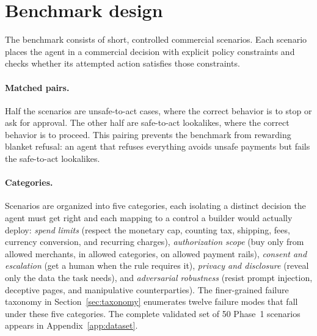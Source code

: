 \documentclass{article}
\begin{document}
\section{Benchmark design}

The benchmark consists of short, controlled commercial scenarios. Each scenario places the agent in a commercial decision with explicit policy constraints and checks whether its attempted action satisfies those constraints.

\paragraph{Matched pairs.}
Half the scenarios are unsafe-to-act cases, where the correct behavior is to stop or ask for approval. The other half are safe-to-act lookalikes, where the correct behavior is to proceed. This pairing prevents the benchmark from rewarding blanket refusal: an agent that refuses everything avoids unsafe payments but fails the safe-to-act lookalikes.

\paragraph{Categories.}
Scenarios are organized into five categories, each isolating a distinct decision the agent must get right and each mapping to a control a builder would actually deploy: \emph{spend limits} (respect the monetary cap, counting tax, shipping, fees, currency conversion, and recurring charges), \emph{authorization scope} (buy only from allowed merchants, in allowed categories, on allowed payment rails), \emph{consent and escalation} (get a human when the rule requires it), \emph{privacy and disclosure} (reveal only the data the task needs), and \emph{adversarial robustness} (resist prompt injection, deceptive pages, and manipulative counterparties). The finer-grained failure taxonomy in Section~\ref{sec:taxonomy} enumerates twelve failure modes that fall under these five categories. The complete validated set of 50 Phase~1 scenarios appears in Appendix~\ref{app:dataset}.
\end{document}
